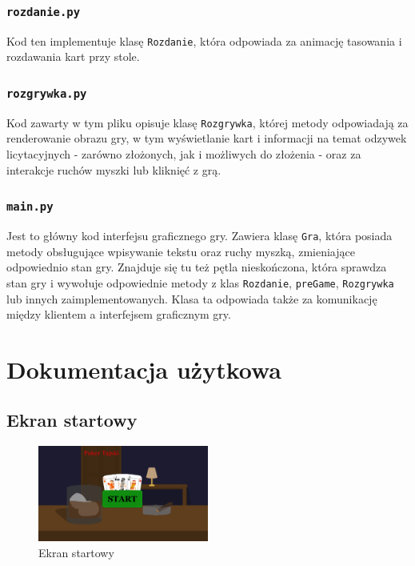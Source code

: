 \documentclass{article}
\begin{document}
\subsubsection{\texttt{rozdanie.py}}
Kod ten implementuje klasę \texttt{Rozdanie}, która odpowiada za animację tasowania i rozdawania kart przy stole.

\subsubsection{\texttt{rozgrywka.py}}
Kod zawarty w tym pliku opisuje klasę \texttt{Rozgrywka}, której metody odpowiadają za renderowanie obrazu gry, w tym wyświetlanie kart i informacji na temat odzywek licytacyjnych - zarówno złożonych, jak i możliwych do złożenia - oraz za interakcje ruchów myszki lub kliknięć z grą.

\subsubsection{\texttt{main.py}}
Jest to główny kod interfejsu graficznego gry. Zawiera klasę \texttt{Gra}, która posiada metody obsługujące wpisywanie tekstu oraz ruchy myszką, zmieniające odpowiednio stan gry. Znajduje się tu też pętla nieskończona, która sprawdza stan gry i wywołuje odpowiednie metody z klas \texttt{Rozdanie}, \texttt{preGame}, \texttt{Rozgrywka} lub innych zaimplementowanych. Klasa ta odpowiada także za komunikację między klientem a interfejsem graficznym gry.

\section{Dokumentacja użytkowa}

\subsection{Ekran startowy}
\begin{figure}[H]
\centering
\includegraphics[width=0.5\textwidth]{start}
\caption{Ekran startowy}
\end{figure}
\end{document}
